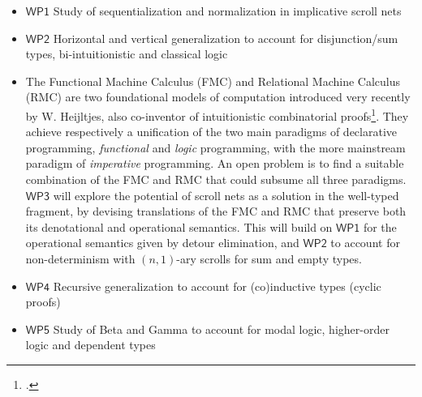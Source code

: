\documentclass[12pt,draftproposal]{msca-pf}
\newcommand{\WP}[1]{$\mathsf{WP#1}$}
\begin{document}
\begin{itemize}
    \item \WP{1} Study of sequentialization and normalization in implicative scroll nets
    \item \WP{2} Horizontal and vertical generalization to account for disjunction/sum types, bi-intuitionistic and classical logic
    \item The Functional Machine Calculus (FMC) and Relational Machine Calculus (RMC) are two
    foundational models of computation introduced very recently by W. Heijltjes, also co-inventor of
    intuitionistic combinatorial
    proofs\footcite{heijltjesFunctionalMachineCalculus2023,barrettRelationalMachineCalculus2024,heijltjes_intuitionistic_2019}.
    They achieve respectively a unification of the two main paradigms of declarative programming,
    \emph{functional} and \emph{logic} programming, with the more mainstream paradigm of
    \emph{imperative} programming. An open problem is to find a suitable combination of the FMC and
    RMC that could subsume all three paradigms. \WP{3} will explore the potential of scroll nets as
    a solution in the well-typed fragment, by devising translations of the FMC and RMC that preserve
    both its denotational and operational semantics. This will build on \WP{1} for the operational
    semantics given by detour elimination, and \WP{2} to account for non-determinism with
    $(n,1)$-ary scrolls for sum and empty types.
    \item \WP{4} Recursive generalization to account for (co)inductive types (cyclic proofs)
    \item \WP{5} Study of \textsf{Beta} and \textsf{Gamma} to account for modal logic, higher-order logic and dependent types
\end{itemize}


\end{document}
